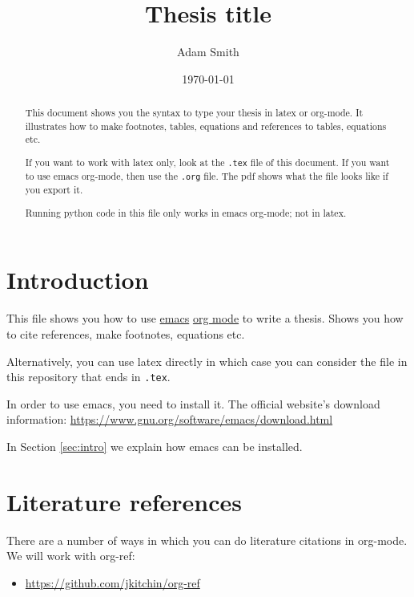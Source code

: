 \documentclass[11pt]{article}
\author{Adam Smith}
\date{\today}
\title{Thesis title}
\begin{document}
\maketitle
\begin{abstract}
This document shows you the syntax to type your thesis in latex or org-mode. It illustrates how to make footnotes, tables, equations and references to tables, equations etc.

If you want to work with latex only, look at the \texttt{.tex} file of this document. If you want to use emacs org-mode, then use the \texttt{.org} file. The pdf shows what the file looks like if you export it.

Running python code in this file only works in emacs org-mode; not in latex.
\end{abstract}

\newpage



\setcounter{tocdepth}{2}
\tableofcontents


\section{Introduction}
\label{sec:org75302b8}
\label{sec:intro}

This file shows you how to use \href{https://www.gnu.org/software/emacs/}{emacs} \href{https://orgmode.org/}{org mode} to write a thesis. Shows you how to cite references, make footnotes, equations etc.

Alternatively, you can use latex directly in which case you can consider the file in this repository that ends in \texttt{.tex}.

In order to use emacs, you need to install it. The official website's download information: \url{https://www.gnu.org/software/emacs/download.html}

In Section \ref{sec:intro} we explain how emacs can be installed.


\section{Literature references}
\label{sec:org5dd2a3d}

There are a number of ways in which you can do literature citations in org-mode. We will work with org-ref:
\begin{itemize}
\item \url{https://github.com/jkitchin/org-ref}
\end{itemize}
\end{document}
